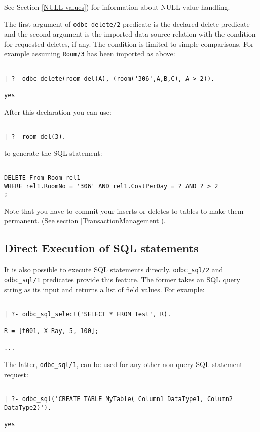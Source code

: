 See Section \ref{NULL-values}) for information about NULL value
handling.

The first argument of {\tt odbc\_delete/2} predicate is the declared delete
predicate and the second argument is the imported data source relation
with the condition for requested deletes, if any.  The condition is
limited to simple comparisons.  For example assuming
{\tt Room/3} has been imported as above:
\begin{verbatim}

| ?- odbc_delete(room_del(A), (room('306',A,B,C), A > 2)). 

yes
\end{verbatim}

After this declaration you can use:
\begin{verbatim}

| ?- room_del(3).
\end{verbatim}

to generate the SQL statement:
\begin{verbatim}

DELETE From Room rel1 
WHERE rel1.RoomNo = '306' AND rel1.CostPerDay = ? AND ? > 2
;
\end{verbatim}

Note that you have to commit your inserts or deletes to tables to make
them permanent.  (See section \ref{TransactionManagement}).

\subsection{ Direct Execution of SQL statements}
It is also possible to execute SQL statements directly. 
{\tt odbc\_sql/2} and {\tt odbc\_sql/1} predicates provide this 
feature.  The former takes an SQL query string as its input and returns 
a list of field values.  For example:
\begin{verbatim}

| ?- odbc_sql_select('SELECT * FROM Test', R).

R = [t001, X-Ray, 5, 100];

...

\end{verbatim}
The latter, {\tt odbc\_sql/1}, can be used for any other non-query SQL statement request:
\begin{verbatim}

| ?- odbc_sql('CREATE TABLE MyTable( Column1 DataType1, Column2 DataType2)').

yes
\end{verbatim}

